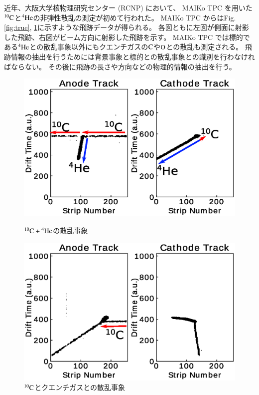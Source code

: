 \documentclass{jps-cp}
\begin{document}
近年、大阪大学核物理研究センター (RCNP) において、
MAIKo TPC を用いた${}^{10}\rm{C}$と${}^{4}\rm{He}$の非弾性散乱の測定が初めて行われた。
MAIKo TPC からはFig. \ref{fig:true}, \ref{fig:false}に示すような飛跡データが得られる。
各図ともに左図が側面に射影した飛跡、右図がビーム方向に射影した飛跡を示す。
MAIKo TPC では標的である${}^{4}\rm{He}$との散乱事象以外にもクエンチガスの$\rm{C}$や$\rm{O}$との散乱も測定される。
飛跡情報の抽出を行うためには背景事象と標的との散乱事象との識別を行わなければならない。
その後に飛跡の長さや方向などの物理的情報の抽出を行う。

\begin{figure}
  \centering
  \begin{minipage}{0.4\columnwidth}
    \begin{center}
      \includegraphics[clip, width=\columnwidth]{eps/true.eps}
      \caption{${}^{10}\rm{C}+{}^{4}\rm{He}$の散乱事象}
      \label{fig:true}
    \end{center}
  \end{minipage}
  \begin{minipage}{0.4\columnwidth}
    \begin{center}
      \includegraphics[clip, width=\columnwidth]{eps/false.eps}
      \caption{${}^{10}\rm{C}$とクエンチガスとの散乱事象}
      \label{fig:false}
    \end{center}
  \end{minipage}
\end{figure}
\end{document}
